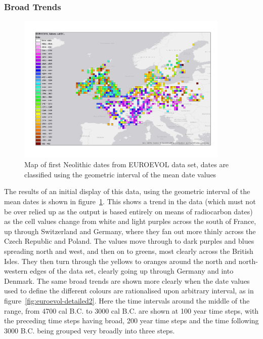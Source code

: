 \subsubsection{Broad Trends}
\begin{figure}
\begin{center}
	\includegraphics[width=0.9\textwidth]{figures/euroevol-detailed3}
\end{center}
  \caption{Map of first Neolithic dates from EUROEVOL data set, dates are classified using the geometric interval of the mean date values}
  \label{fig:euroevol-detailed1}
\end{figure}

The results of an initial display of this data, using the geometric interval of the mean dates is shown in figure~\ref{fig:euroevol-detailed1}. This shows a trend in the data (which must not be over relied up as the output is based entirely on means of radiocarbon dates) as the cell values change from white and light purples across the south of France, up through Switzerland and Germany, where they fan out more thinly across the Czech Republic and Poland. The values move through to dark purples and blues spreading north and west, and then on to greens, most clearly across the British Isles. They then turn through the yellows to oranges around the north and north-western edges of the data set, clearly going up through Germany and into Denmark. The same broad trends are shown more clearly when the date values used to define the different colours are rationalised upon arbitrary interval, as in figure~\ref{fig:euroevol-detailed2}. Here the time intervals around the middle of the range, from 4700 cal B.C. to 3000 cal B.C. are shown at 100 year time steps, with the preceding time steps having broad, 200 year time steps and the time following 3000 B.C. being grouped very broadly into three steps. 


